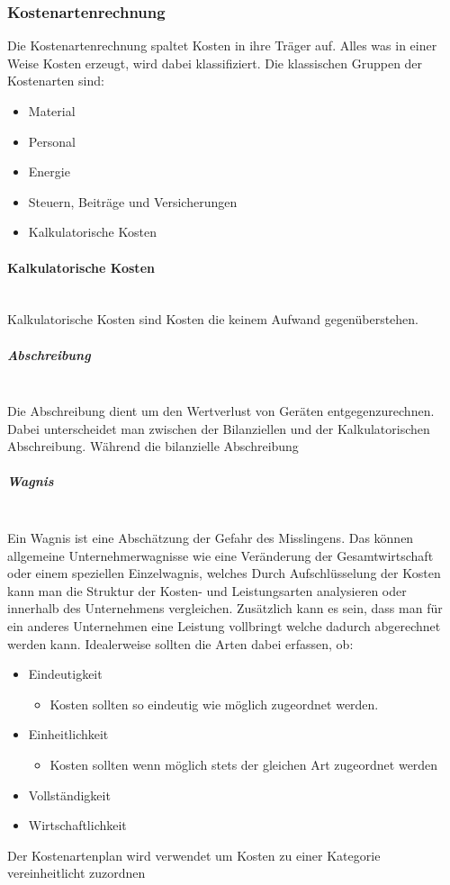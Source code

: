 \documentclass{article}
\newcommand{\paragraphlb}[1]{\paragraph{#1}\mbox{}\\}
\newcommand{\subparagraphlb}[1]{\subparagraph{#1}\mbox{}\\}
\begin{document}
	\subsubsection{Kostenartenrechnung}
	Die Kostenartenrechnung spaltet Kosten in ihre Träger auf. Alles was in einer Weise Kosten erzeugt, wird dabei klassifiziert. Die klassischen Gruppen der Kostenarten sind:
	\begin{itemize}
		\item{Material}
		\item{Personal}
		\item{Energie}
		\item{Steuern, Beiträge und Versicherungen}
		\item{Kalkulatorische Kosten}
	\end{itemize}
	\paragraphlb{Kalkulatorische Kosten}
	Kalkulatorische Kosten sind Kosten die keinem Aufwand gegenüberstehen.
	\subparagraphlb{Abschreibung}
	Die Abschreibung dient um den Wertverlust von Geräten entgegenzurechnen. Dabei unterscheidet man zwischen der Bilanziellen und der Kalkulatorischen Abschreibung. Während die bilanzielle Abschreibung
	\subparagraphlb{Wagnis}
	Ein Wagnis ist eine Abschätzung der Gefahr des Misslingens. Das können allgemeine Unternehmerwagnisse wie eine Veränderung der Gesamtwirtschaft oder einem speziellen Einzelwagnis, welches
	Durch Aufschlüsselung der Kosten kann man die Struktur der Kosten- und Leistungsarten analysieren oder innerhalb des Unternehmens vergleichen. Zusätzlich kann es sein, dass man für ein anderes Unternehmen eine Leistung vollbringt welche dadurch abgerechnet werden kann. Idealerweise sollten die Arten dabei erfassen, ob:
	\begin{itemize}
		\item{Eindeutigkeit}
		\begin{itemize}
			\item{Kosten sollten so eindeutig wie möglich zugeordnet werden.}
		\end{itemize}
		\item{Einheitlichkeit}
		\begin{itemize}
			\item{Kosten sollten wenn möglich stets der gleichen Art zugeordnet werden}
		\end{itemize}
		\item{Vollständigkeit}
		\item{Wirtschaftlichkeit}
	\end{itemize}
	Der Kostenartenplan wird verwendet um Kosten zu einer Kategorie vereinheitlicht zuzordnen
\end{document}
